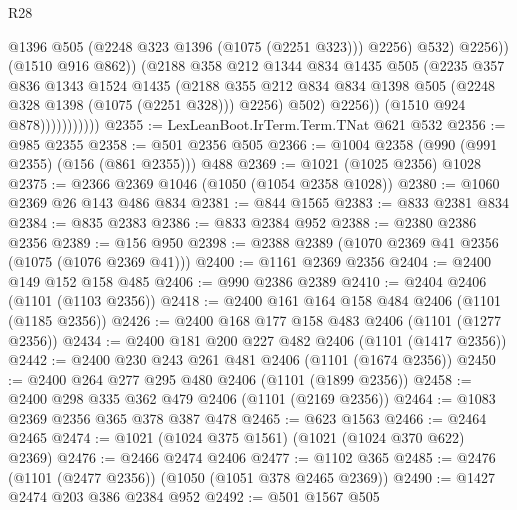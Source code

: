 \begin{lexlean}{R28}
\begin{coremodule}
                                    @1396
                                    @505
                                    (@2248 @323 @1396 (@1075 (@2251 @323)))
                                    @2256)
                                  @532)
                                @2256))
                            (@1510 @916 @862))
                          (@2188
                            @358
                            @212
                            @1344
                            @834
                            @1435
                            @505
                            (@2235
                              @357
                              @836
                              @1343
                              @1524
                              @1435
                              (@2188
                                @355
                                @212
                                @834
                                @834
                                @1398
                                @505
                                (@2248 @328 @1398 (@1075 (@2251 @328)))
                                @2256)
                              @502)
                            @2256))
                        (@1510 @924 @878)))))))))))
@2355 := LexLeanBoot.IrTerm.Term.TNat @621 @532
@2356 := @985 @2355
@2358 := @501 @2356 @505
@2366 := @1004 @2358 (@990 (@991 @2355) (@156 (@861 @2355))) @488
@2369 := @1021 (@1025 @2356) @1028
@2375 := @2366 @2369 @1046 (@1050 (@1054 @2358 @1028))
@2380 := @1060 @2369 @26 @143 @486 @834
@2381 := @844 @1565
@2383 := @833 @2381 @834
@2384 := @835 @2383
@2386 := @833 @2384 @952
@2388 := @2380 @2386 @2356
@2389 := @156 @950
@2398 := @2388 @2389 (@1070 @2369 @41 @2356 (@1075 (@1076 @2369 @41)))
@2400 := @1161 @2369 @2356
@2404 := @2400 @149 @152 @158 @485
@2406 := @990 @2386 @2389
@2410 := @2404 @2406 (@1101 (@1103 @2356))
@2418 := @2400 @161 @164 @158 @484 @2406 (@1101 (@1185 @2356))
@2426 := @2400 @168 @177 @158 @483 @2406 (@1101 (@1277 @2356))
@2434 := @2400 @181 @200 @227 @482 @2406 (@1101 (@1417 @2356))
@2442 := @2400 @230 @243 @261 @481 @2406 (@1101 (@1674 @2356))
@2450 := @2400 @264 @277 @295 @480 @2406 (@1101 (@1899 @2356))
@2458 := @2400 @298 @335 @362 @479 @2406 (@1101 (@2169 @2356))
@2464 := @1083 @2369 @2356 @365 @378 @387 @478
@2465 := @623 @1563
@2466 := @2464 @2465
@2474 := @1021 (@1024 @375 @1561) (@1021 (@1024 @370 @622) @2369)
@2476 := @2466 @2474 @2406
@2477 := @1102 @365
@2485 := @2476 (@1101 (@2477 @2356)) (@1050 (@1051 @378 @2465 @2369))
@2490 := @1427 @2474 @203 @386 @2384 @952
@2492 := @501 @1567 @505

\end{coremodule}
\end{lexlean}
